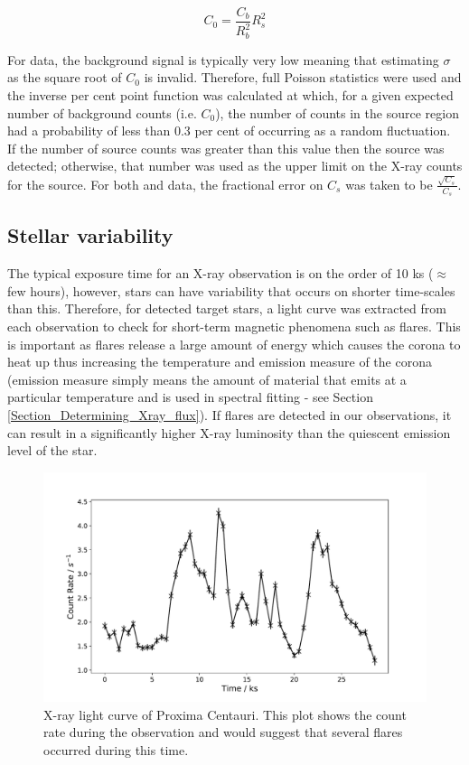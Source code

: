 \begin{equation}
    C_{0} = \frac{C_{b}}{R_{b}^{2}}R_{s}^{2}
    \label{Eq:C0_equation}
\end{equation}

For \Chandra data, the background signal is typically very low meaning that estimating $\sigma$ as the square root of $C_{0}$ is invalid. Therefore, full Poisson statistics were used and the inverse per cent point function was calculated at which, for a given expected number of background counts (i.e. $C_{0}$), the number of counts in the source region had a probability of less than 0.3 per cent of occurring as a random fluctuation. If the number of source counts was greater than this value then the source was detected; otherwise, that number was used as the upper limit on the X-ray counts for the source. For both \Chandra and \XMM data, the fractional error on $C_{s}$ was taken to be $\frac{\sqrt{C_{s}}}{C_{s}}$.

\subsection{Stellar variability}
The typical exposure time for an X-ray observation is on the order of 10 ks ($\approx$ few hours), however, stars can have variability that occurs on shorter time-scales than this. Therefore, for detected target stars, a light curve was extracted from each observation to check for short-term magnetic phenomena such as flares. This is important as flares release a large amount of energy which causes the corona to heat up thus increasing the temperature and emission measure of the corona (emission measure simply means the amount of material that emits at a particular temperature and is used in spectral fitting - see Section \ref{Section_Determining_Xray_flux}). If flares are detected in our observations, it can result in a significantly higher X-ray luminosity than the quiescent emission level of the star.

\begin{figure}
    \centering
    \includegraphics[scale=0.5]{Figures/3-Xray_age/proxima_cen_lc.pdf}
    \caption[X-ray light curve of Proxima Centauri]{X-ray light curve of Proxima Centauri. This plot shows the count rate during the observation and would suggest that several flares occurred during this time.}
    \label{fig:proxima_cen_lc}
\end{figure}

